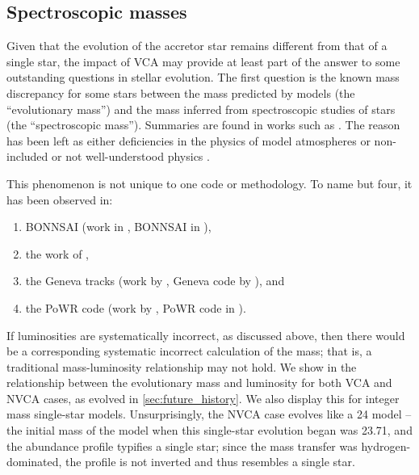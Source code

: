 \subsection{Spectroscopic masses}

\alice

Given that the evolution of the accretor star remains different from that of a single star, the impact of VCA may provide at least part of the answer to some outstanding questions in stellar evolution. The first question is the known mass discrepancy for some stars between the mass predicted by models (the ``evolutionary mass'') and the mass inferred from spectroscopic studies of stars (the ``spectroscopic mass''). Summaries are found in works such as \citet{Herrero:1992, Massey:2009, Bouret:2013, Massey:2013, McEvoy:2015, Markova:2018, Ramachandran:2018, Bestenlehner:2020}. The reason has been left as either deficiencies in the physics of model atmospheres \citep{Herrero:1992} or non-included or not well-understood physics \citep{Bestenlehner:2020}.

This phenomenon is not unique to one code or methodology. To name but four, it has been observed in:

\begin{enumerate}
    \item BONNSAI (work in \citealt{Bestenlehner:2020}, BONNSAI in \citealt{Schneider:2014}),
    \item the work of \citet{Maeder:1990} \citep{Herrero:1992},
    \item the Geneva tracks (work by \citealt{Markova:2018}, Geneva code by \citealt{Ekstrom:2012}), and
    \item the PoWR code (work by \citealt{Ramachandran:2018}, PoWR code in \citealt{Grafener:2002, Hamann:2003, Sander:2015}).
\end{enumerate}

If luminosities are systematically incorrect, as discussed above, then there would be a corresponding systematic incorrect calculation of the mass; that is, a traditional mass-luminosity relationship may not hold. We show in  the relationship between the evolutionary mass and luminosity for both VCA and NVCA cases, as evolved in \autoref{sec:future_history}. We also display this for integer mass single-star models. Unsurprisingly, the NVCA case evolves like a \SI{24}{\msun} model -- the initial mass of the model when this single-star evolution began was \SI{23.71}{\msun}, and the abundance profile typifies a single star; since the mass transfer was hydrogen-dominated, the profile is not inverted and thus resembles a single star.

